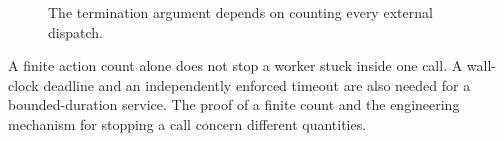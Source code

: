 \begin{figure}[H]
\centering
{}
\caption{The termination argument depends on counting every external dispatch.}\label{fig:teach-M06-16}
\end{figure}

A finite action count alone does not stop a worker stuck inside one call. A wall-clock deadline and an independently enforced timeout are also needed for a bounded-duration service. The proof of a finite count and the engineering mechanism for stopping a call concern different quantities.

